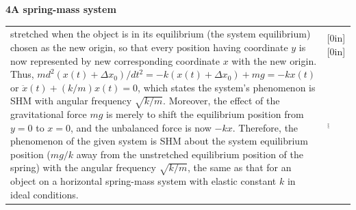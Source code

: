 \documentclass[a4paper,12pt,oneside]{report}
\newenvironment{tree}[4]{
\begin{list}{#1}{\parskip=0in \topsep=0in \itemsep=0in \parsep=0in \partopsep=0in \leftmargin=#2 \rightmargin=#3 \itemindent=#4 \listparindent=\itemindent}
}{\end{list}}
\newenvironment{ssection}[5]{
\phantom{#1}\textbf{#2\space#3}
\begin{tree}{#4}{0in}{0in}{#5}
}{\end{tree}}
\begin{document}
\begin{ssection}{\space}{4}{A spring-mass system}{\textbullet}{\parindent}
\begin{tabular}{p{}p{}}
stretched when the object is in its equilibrium (the system equilibrium) chosen as the new origin, so that every position having coordinate $y$ is now represented by new corresponding coordinate $x$ with the new origin. Thus, $md^{2}(x(t)+\Delta x_{0})/dt^{2}=-k(x(t)+\Delta x_{0})+mg=-kx(t)$ or $\ddot{x}(t)+(k/m)x(t)=0$, which states the system's phenomenon is SHM with angular frequency $\sqrt{k/m}$. Moreover, the effect of the gravitational force $mg$ is merely to shift the equilibrium position from $y=0$ to $x=0$, and the unbalanced force is now $-kx$. Therefore, the phenomenon of the given system is SHM about the system equilibrium position ($mg/k$ away from the unstretched equilibrium position of the spring) with the angular frequency $\sqrt{k/m}$, the same as that for an object on a horizontal spring-mass system with elastic constant $k$ in ideal conditions.&\raisebox{-140pt}[0in][0in]{\includegraphics[width=0.11\textwidth,height=150pt]{figures/13Dec2.pdf}}
\end{tabular}
\end{ssection}\
\end{document}
